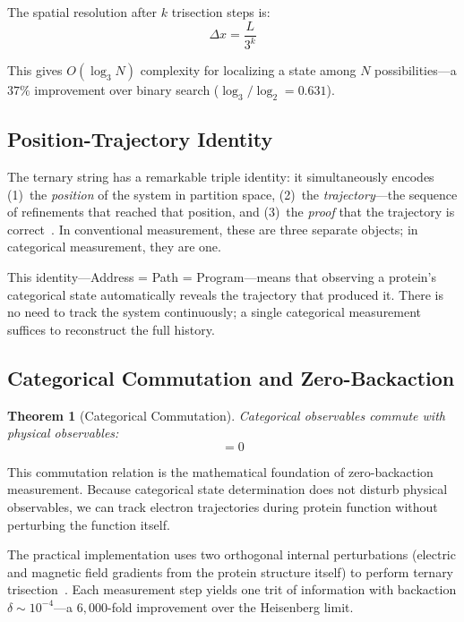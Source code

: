 \documentclass[aps,prx,superscriptaddress,twocolumn,10pt,a4paper,longbibliography,preprint]{revtex4-2}
\newtheorem{theorem}{Theorem}[section]
\theoremstyle{definition}
\theoremstyle{remark}
\begin{document}
The spatial resolution after $k$ trisection steps is:
\begin{equation}
\Delta x = \frac{L}{3^k}
\label{eq:resolution}
\end{equation}

This gives $O(\log_3 N)$ complexity for localizing a state among $N$ possibilities---a $37\%$ improvement over binary search ($\log_3 / \log_2 = 0.631$).

\subsection{Position-Trajectory Identity}

The ternary string has a remarkable triple identity: it simultaneously encodes (1)~the \emph{position} of the system in partition space, (2)~the \emph{trajectory}---the sequence of refinements that reached that position, and (3)~the \emph{proof} that the trajectory is correct~\cite{Sachikonye2026b}. In conventional measurement, these are three separate objects; in categorical measurement, they are one.

This identity---Address = Path = Program---means that observing a protein's categorical state automatically reveals the trajectory that produced it. There is no need to track the system continuously; a single categorical measurement suffices to reconstruct the full history.

\subsection{Categorical Commutation and Zero-Backaction}

\begin{theorem}[Categorical Commutation]
\label{thm:commutation}
Categorical observables commute with physical observables:
\begin{equation}
[\hat{O}_{\text{cat}}, \hat{O}_{\text{phys}}] = 0
\label{eq:commutation}
\end{equation}
\end{theorem}

This commutation relation is the mathematical foundation of zero-backaction measurement. Because categorical state determination does not disturb physical observables, we can track electron trajectories during protein function without perturbing the function itself.

The practical implementation uses two orthogonal internal perturbations (electric and magnetic field gradients from the protein structure itself) to perform ternary trisection~\cite{Sachikonye2026b}. Each measurement step yields one trit of information with backaction $\delta \sim 10^{-4}$---a $6{,}000$-fold improvement over the Heisenberg limit.
\end{document}
